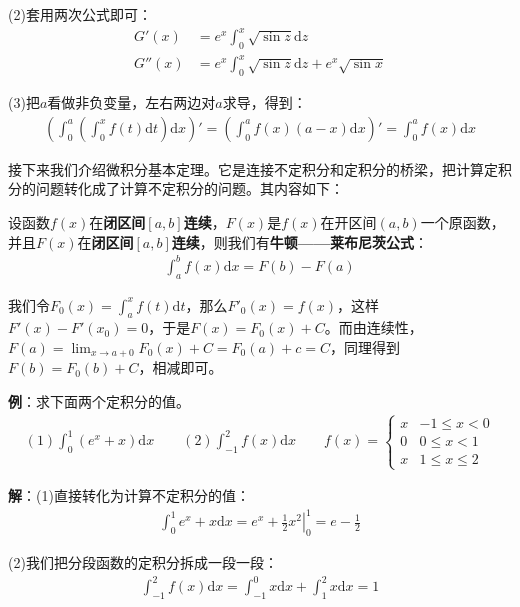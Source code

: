 \documentclass{ctexart}
\let\oldtextbf\textbf %
\renewcommand{\textbf}[1]{\textcolor{btex}{\oldtextbf{#1}}} %
\begin{document}
(2)套用两次公式即可：
\begin{align*}
    G'(x)&=e^x\int_0^x\sqrt{\sin z}\mathrm{d}z \\
    G''(x)&=e^x\int_0^x\sqrt{\sin z}\mathrm{d}z+e^x\sqrt{\sin x}
\end{align*}

(3)把$a$看做非负变量，左右两边对$a$求导，得到：
\begin{align*}
   \left( \int_0^a\left(\int_0^x f(t)\mathrm{d}t\right)\mathrm{d}x\right)'=\left(\int_0^a f(x)(a-x)\mathrm{d}x\right)'=\int_0^a f(x)\mathrm{d}x
\end{align*}

接下来我们介绍微积分基本定理。它是连接不定积分和定积分的桥梁，把计算定积分的问题转化成了计算不定积分的问题。其内容如下：
\begin{tcolorbox}[
    colback=bac1,     %
    colframe=fra1,   %
    coltitle=white,             %
    coltext=tex1,
    title=微积分基本定理,
    fonttitle=\bfseries,        %
arc=3mm,                     %
breakable
]
设函数$f(x)$在\textbf{闭区间$[a,b]$连续}，$F(x)$是$f(x)$在开区间$(a,b)$一个原函数，并且$F(x)$在\textbf{闭区间$[a,b]$连续}，则我们有\textbf{牛顿——莱布尼茨公式}：
\begin{align*}
    \int_a^b f(x)\mathrm{d}x=F(b)-F(a)\tag{5-9}
\end{align*}
\end{tcolorbox}

我们令$F_0(x)=\int_a^x f(t)\mathrm{d}t$，那么$F'_0(x)=f(x)$，这样$F'(x)-F'(x_0)=0$，于是$F(x)=F_0(x)+C$。而由连续性，$F(a)=\lim_{x\to a+0}F_0(x)+C=F_0(a)+c=C$，同理得到$F(b)=F_0(b)+C$，相减即可。

\textbf{例}：求下面两个定积分的值。
\begin{align*}
    (1) \int_0^1 (e^x+x)\mathrm{d}x\qquad (2)\int_{-1}^2f(x)\mathrm{d}x\qquad f(x)=\begin{cases}
        x & -1\leq x<0\\
        0 & 0\leq x<1\\
        x & 1\leq x\leq 2
    \end{cases}
\end{align*}

\textbf{解}：(1)直接转化为计算不定积分的值：
\begin{align*}
    \int_0^1 e^x+x\mathrm{d}x=\left. e^x+\frac{1}{2}x^2\right|_0^1=e-\frac{1}{2}
\end{align*}

(2)我们把分段函数的定积分拆成一段一段：
\begin{align*}
    \int_{-1}^2 f(x)\mathrm{d}x=\int_{-1}^ 0 x\mathrm{d}x+\int_1^2 x\mathrm{d}x=1
\end{align*}
\end{document}
